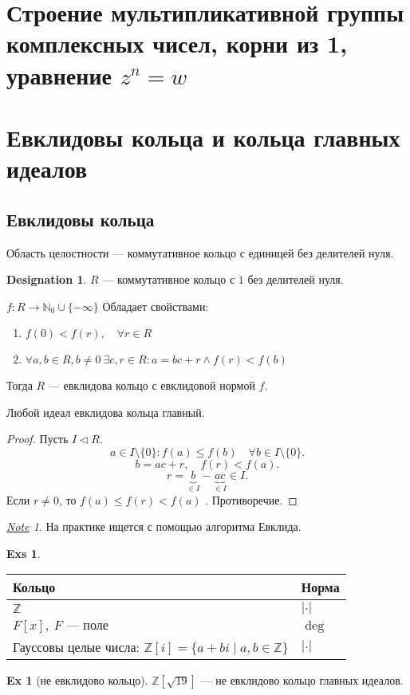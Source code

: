 \documentclass[11pt]{book}
\newcommand{\Z}{\mathbb{Z}}
\newcommand{\N}{\mathbb{N}}
\renewcommand{\le}{\leqslant}
\theoremstyle{definition}
\theoremstyle{plain}
\theoremstyle{plain}
\theoremstyle{definition}
\newtheorem*{ex}{Ex}
\newtheorem*{exs}{Exs}
\newtheorem*{name}{Designation}
\theoremstyle{remark}
\newtheorem*{note}{\underline{Note}}
\begin{document}
\section{Строение мультипликативной группы комплексных чисел, корни из 1, уравнение $ z^{n} = w$}
\section{Евклидовы кольца и кольца главных идеалов}
\subsection{Евклидовы кольца}
\begin{defn}
 	Область целостности --- коммутативное кольцо с единицей без делителей нуля.   
\end{defn}
\begin{name}
    $ R$ --- коммутативное кольцо с $ 1$ без делителей нуля.
\end{name}
\begin{defn}
    $ f: R \to  \N_0 \cup \{-\infty\}$ 
    Обладает свойствами:
    \begin{enumerate}
	\item $ f(0) < f(r), \quad \forall  r \in  R$
	\item $ \forall a, b \in  R, b\ne 0 ~ \exists  c, r \in R: a = b c + r \wedge f(r) < f(b)$
    \end{enumerate}
    Тогда $ R$ --- евклидова кольцо с евклидовой нормой  $ f$.
\end{defn}
\begin{thm}
    Любой идеал евклидова кольца главный.
\end{thm}
\begin{proof}
    Пусть $ I \triangleleft  R$. 
    \[
	a \in  I \setminus \{0\}: f(a) \le  f(b) \quad \forall  b \in  I \setminus \{0\}
    .\] 
    \[
	b = ac + r, \quad f(r) < f(a)
    .\] 
    \[
	r = \underbrace{b}_{\in I} - \underbrace{ac}_{ \in  I} \in  I 
    .\] 
    Если $r \ne 0$, то $ f(a) \le  f(r) < f(a)$ . Противоречие. 
\end{proof}
\begin{note}
    На практике ищется с помощью алгоритма Евклида.
\end{note}
\begin{exs}
    \begin{tabular}[ht]{l|l}
	Кольцо & Норма\\
	\hline
	$ \Z$ &$ |\cdot|$\\
	$ F[x], ~ F \text{ --- поле}$ & $  \deg$\\
	Гауссовы целые числа: $ \Z[i] = \{a + bi \mid a, b \in\Z\}$ & $ |\cdot|$
    \end{tabular}
\end{exs}
\begin{ex}[не евклидово кольцо]
    $ \Z [\sqrt{19}]$ --- не евклидово кольцо главных идеалов. 
\end{ex}
\end{document}
